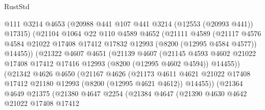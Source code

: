 \begin{lexlean}{RustStd}
\begin{coremodule}
                        @111
                        @3214
                        @4653
                        (@20988 @441 @107 @441 @3214 (@12553 (@20993 @441)) @17315)
                        (@21104
                          @1064
                          @22
                          @110
                          @4589
                          @4652
                          (@21111
                            @4589
                            (@21117
                              @4576
                              @4584
                              @21022
                              @17408
                              @17412
                              @17832
                              @12993
                              (@8200 (@12995 @4584 @4577))
                              @14455))
                          (@21322
                            @4607
                            @4651
                            (@21139
                              @4607
                              (@21145
                                @4593
                                @4602
                                @21022
                                @17408
                                @17412
                                @17416
                                @12993
                                (@8200 (@12995 @4602 @4594))
                                @14455))
                            (@21342
                              @4626
                              @4650
                              (@21167
                                @4626
                                (@21173
                                  @4611
                                  @4621
                                  @21022
                                  @17408
                                  @17412
                                  @21180
                                  @12993
                                  (@8200 (@12995 @4621 @4612))
                                  @14455))
                              (@21364
                                @4649
                                @21375
                                (@21380
                                  @4647
                                  @2254
                                  (@21384
                                    @4647
                                    (@21390
                                      @4630
                                      @4642
                                      @21022
                                      @17408
                                      @17412

\end{coremodule}
\end{lexlean}
